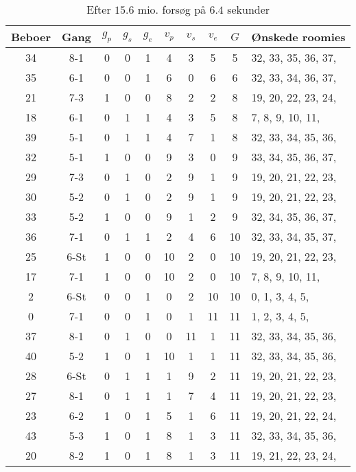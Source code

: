 \documentclass[article,oneside,11pt,a4paper]{memoir}
\newenvironment{assignment}[1]{
\begin{table}[h]
\caption{#1}
\footnotesize
\begin{center}
\begin{tabular}{cccccccccl}
\toprule
Beboer & Gang & $g_p$ & $g_s$ & $g_e$ & $v_p$ & $v_s$ & $v_e$ & $G$ & Ønskede roomies \\ \midrule
}{
\bottomrule
\end{tabular}
\end{center}
\end{table}

}
\begin{document}
\begin{assignment}{Efter $15.6$ mio. forsøg på $6.4$ sekunder}
    34 & 8-1  &   0 &   0 &   1 &   4 &   3 &   5 &  5 &  32, 33, 35, 36, 37, \\
    35 & 6-1  &   0 &   0 &   1 &   6 &   0 &   6 &  6 &  32, 33, 34, 36, 37, \\
    21 & 7-3  &   1 &   0 &   0 &   8 &   2 &   2 &  8 &  19, 20, 22, 23, 24, \\
    18 & 6-1  &   0 &   1 &   1 &   4 &   3 &   5 &  8 &   7,  8,  9, 10, 11, \\
    39 & 5-1  &   0 &   1 &   1 &   4 &   7 &   1 &  8 &  32, 33, 34, 35, 36, \\
    32 & 5-1  &   1 &   0 &   0 &   9 &   3 &   0 &  9 &  33, 34, 35, 36, 37, \\
    29 & 7-3  &   0 &   1 &   0 &   2 &   9 &   1 &  9 &  19, 20, 21, 22, 23, \\
    30 & 5-2  &   0 &   1 &   0 &   2 &   9 &   1 &  9 &  19, 20, 21, 22, 23, \\
    33 & 5-2  &   1 &   0 &   0 &   9 &   1 &   2 &  9 &  32, 34, 35, 36, 37, \\
    36 & 7-1  &   0 &   1 &   1 &   2 &   4 &   6 & 10 &  32, 33, 34, 35, 37, \\
    25 & 6-St &   1 &   0 &   0 &  10 &   2 &   0 & 10 &  19, 20, 21, 22, 23, \\
    17 & 7-1  &   1 &   0 &   0 &  10 &   2 &   0 & 10 &   7,  8,  9, 10, 11, \\
     2 & 6-St &   0 &   0 &   1 &   0 &   2 &  10 & 10 &   0,  1,  3,  4,  5, \\
     0 & 7-1  &   0 &   0 &   1 &   0 &   1 &  11 & 11 &   1,  2,  3,  4,  5, \\
    37 & 8-1  &   0 &   1 &   0 &   0 &  11 &   1 & 11 &  32, 33, 34, 35, 36, \\
    40 & 5-2  &   1 &   0 &   1 &  10 &   1 &   1 & 11 &  32, 33, 34, 35, 36, \\
    28 & 6-St &   0 &   1 &   1 &   1 &   9 &   2 & 11 &  19, 20, 21, 22, 23, \\
    27 & 8-1  &   0 &   1 &   1 &   1 &   7 &   4 & 11 &  19, 20, 21, 22, 23, \\
    23 & 6-2  &   1 &   0 &   1 &   5 &   1 &   6 & 11 &  19, 20, 21, 22, 24, \\
    43 & 5-3  &   1 &   0 &   1 &   8 &   1 &   3 & 11 &  32, 33, 34, 35, 36, \\
    20 & 8-2  &   1 &   0 &   1 &   8 &   1 &   3 & 11 &  19, 21, 22, 23, 24, \\

\end{assignment}
\end{document}
